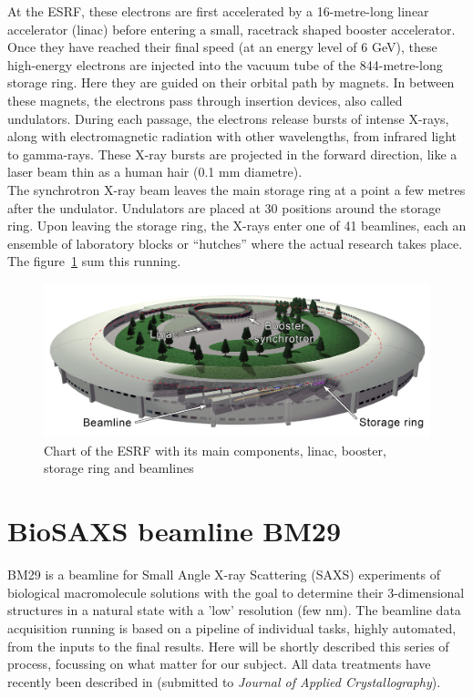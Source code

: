 \documentclass[a4paper, 11pt]{report}
\begin{document}
At the ESRF, these electrons are first accelerated by a 16-metre-long 
linear accelerator (linac) before entering a small, racetrack shaped 
booster accelerator. 
Once they have reached their final speed (at an energy level of 6 GeV), 
these high-energy electrons are injected into the vacuum tube of the
844-metre-long storage ring.
Here they are guided on their orbital path by magnets. 
In between these magnets, the electrons pass through insertion 
devices, also called undulators.
During each passage, the electrons release bursts of intense X-rays, 
along with electromagnetic radiation with other wavelengths, from 
infrared light to gamma-rays. 
These X-ray bursts are projected in the forward direction, like a 
laser beam thin as a human hair (0.1 mm diametre).\\

The synchrotron X-ray beam leaves the main storage ring at a point a 
few metres after the undulator. 
Undulators are placed at 30 positions around the storage ring.
Upon leaving the storage ring, the X-rays enter one of 41 beamlines, 
each an ensemble of laboratory blocks or “hutches” where the actual 
research takes place. 
The figure~\ref{fgr:synchrotron} sum this running.

\begin{figure}
\centering
\includegraphics[scale=0.22]{synchrotron.png}
\caption{Chart of the ESRF with its main components, linac, booster, 
    storage ring and beamlines}
\label{fgr:synchrotron}
\end{figure}

\section{BioSAXS beamline BM29}
\label{bm29}
BM29 \cite{BM29paper} is a beamline for Small Angle X-ray Scattering 
(SAXS) experiments of biological macromolecule solutions with the goal 
to determine their 3-dimensional structures in a natural state with a 
'low' resolution (few nm). 
The beamline data acquisition running is based on a pipeline of 
individual tasks, highly automated, from the inputs to the final 
results. 
Here will be shortly described this series of process, focussing on 
what matter for our subject.
All data treatments have recently been described in \cite{BM29news} 
(submitted to \textit{Journal of Applied Crystallography}).\\
\end{document}
